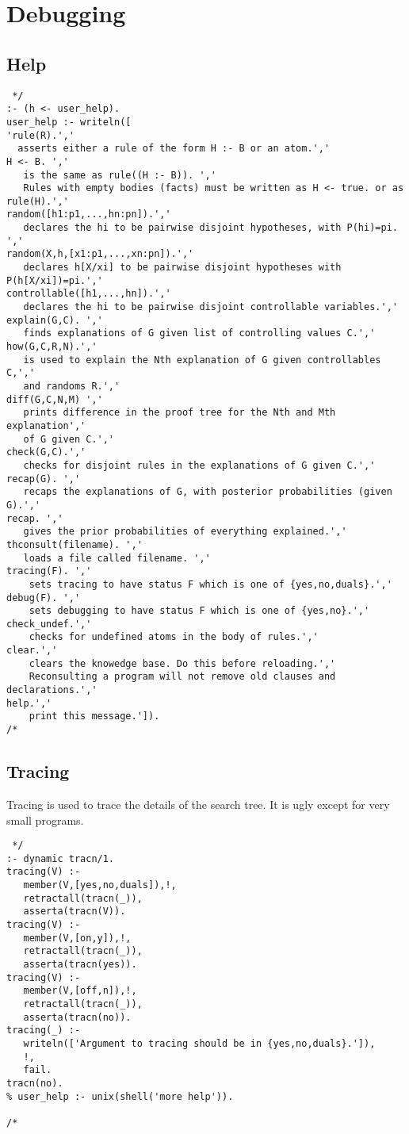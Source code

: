 \documentclass[11pt,fleqn]{article}
\begin{document}
\section{Debugging}
\subsection{Help}
\begin{verbatim} */
:- (h <- user_help).
user_help :- writeln([
'rule(R).','
  asserts either a rule of the form H :- B or an atom.','
H <- B. ','
   is the same as rule((H :- B)). ','
   Rules with empty bodies (facts) must be written as H <- true. or as rule(H).','
random([h1:p1,...,hn:pn]).','
   declares the hi to be pairwise disjoint hypotheses, with P(hi)=pi. ','
random(X,h,[x1:p1,...,xn:pn]).','
   declares h[X/xi] to be pairwise disjoint hypotheses with P(h[X/xi])=pi.','
controllable([h1,...,hn]).','
   declares the hi to be pairwise disjoint controllable variables.','
explain(G,C). ','
   finds explanations of G given list of controlling values C.','
how(G,C,R,N).','
   is used to explain the Nth explanation of G given controllables C,','
   and randoms R.',' 
diff(G,C,N,M) ','
   prints difference in the proof tree for the Nth and Mth explanation','
   of G given C.','
check(G,C).','
   checks for disjoint rules in the explanations of G given C.','
recap(G). ','
   recaps the explanations of G, with posterior probabilities (given G).','
recap. ','
   gives the prior probabilities of everything explained.','
thconsult(filename). ','
   loads a file called filename. ','
tracing(F). ','
    sets tracing to have status F which is one of {yes,no,duals}.','
debug(F). ','
    sets debugging to have status F which is one of {yes,no}.','
check_undef.','
    checks for undefined atoms in the body of rules.','
clear.','
    clears the knowedge base. Do this before reloading.','
    Reconsulting a program will not remove old clauses and declarations.','
help.','
    print this message.']).
/* \end{verbatim}

\subsection{Tracing}
Tracing is used to trace the details of the search tree. It is ugly
except for very small programs.
\begin{verbatim} */
:- dynamic tracn/1.
tracing(V) :-
   member(V,[yes,no,duals]),!,
   retractall(tracn(_)),
   asserta(tracn(V)).
tracing(V) :-
   member(V,[on,y]),!,
   retractall(tracn(_)),
   asserta(tracn(yes)).
tracing(V) :-
   member(V,[off,n]),!,
   retractall(tracn(_)),
   asserta(tracn(no)).
tracing(_) :-
   writeln(['Argument to tracing should be in {yes,no,duals}.']),
   !,
   fail.
tracn(no).
% user_help :- unix(shell('more help')).

/* \end{verbatim}
\end{document}
